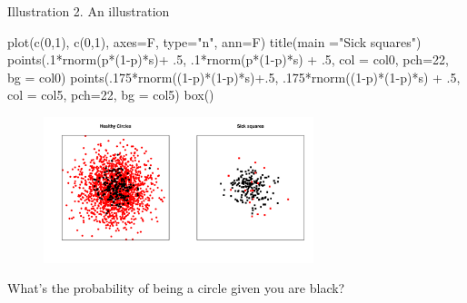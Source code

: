 \documentclass[
  11pt,
  ignorenonframetext,
]{beamer}
\newenvironment{Shaded}{\begin{snugshade}}{\end{snugshade}}
\newcommand{\AttributeTok}[1]{\textcolor[rgb]{0.40,0.45,0.13}{#1}}
\newcommand{\DecValTok}[1]{\textcolor[rgb]{0.68,0.00,0.00}{#1}}
\newcommand{\FunctionTok}[1]{\textcolor[rgb]{0.28,0.35,0.67}{#1}}
\newcommand{\NormalTok}[1]{\textcolor[rgb]{0.00,0.23,0.31}{#1}}
\newcommand{\SpecialCharTok}[1]{\textcolor[rgb]{0.37,0.37,0.37}{#1}}
\newcommand{\StringTok}[1]{\textcolor[rgb]{0.13,0.47,0.30}{#1}}
\begin{document}
\begin{frame}[fragile]{Illustration 2. An illustration}
\begin{Shaded}
\begin{Highlighting}[]
    \FunctionTok{plot}\NormalTok{(}\FunctionTok{c}\NormalTok{(}\DecValTok{0}\NormalTok{,}\DecValTok{1}\NormalTok{), }\FunctionTok{c}\NormalTok{(}\DecValTok{0}\NormalTok{,}\DecValTok{1}\NormalTok{), }\AttributeTok{axes=}\NormalTok{F, }\AttributeTok{type=}\StringTok{"n"}\NormalTok{, }\AttributeTok{ann=}\NormalTok{F)}
    \FunctionTok{title}\NormalTok{(}\AttributeTok{main =}\StringTok{"Sick squares"}\NormalTok{)}
    \FunctionTok{points}\NormalTok{(.}\DecValTok{1}\SpecialCharTok{*}\FunctionTok{rnorm}\NormalTok{(p}\SpecialCharTok{*}\NormalTok{(}\DecValTok{1}\SpecialCharTok{{-}}\NormalTok{p)}\SpecialCharTok{*}\NormalTok{s)}\SpecialCharTok{+}\NormalTok{ .}\DecValTok{5}\NormalTok{, .}\DecValTok{1}\SpecialCharTok{*}\FunctionTok{rnorm}\NormalTok{(p}\SpecialCharTok{*}\NormalTok{(}\DecValTok{1}\SpecialCharTok{{-}}\NormalTok{p)}\SpecialCharTok{*}\NormalTok{s) }\SpecialCharTok{+}\NormalTok{ .}\DecValTok{5}\NormalTok{, }\AttributeTok{col =}\NormalTok{ col0, }\AttributeTok{pch=}\DecValTok{22}\NormalTok{, }\AttributeTok{bg =}\NormalTok{ col0)}
    \FunctionTok{points}\NormalTok{(.}\DecValTok{175}\SpecialCharTok{*}\FunctionTok{rnorm}\NormalTok{((}\DecValTok{1}\SpecialCharTok{{-}}\NormalTok{p)}\SpecialCharTok{*}\NormalTok{(}\DecValTok{1}\SpecialCharTok{{-}}\NormalTok{p)}\SpecialCharTok{*}\NormalTok{s)}\SpecialCharTok{+}\NormalTok{.}\DecValTok{5}\NormalTok{, .}\DecValTok{175}\SpecialCharTok{*}\FunctionTok{rnorm}\NormalTok{((}\DecValTok{1}\SpecialCharTok{{-}}\NormalTok{p)}\SpecialCharTok{*}\NormalTok{(}\DecValTok{1}\SpecialCharTok{{-}}\NormalTok{p)}\SpecialCharTok{*}\NormalTok{s) }\SpecialCharTok{+}\NormalTok{ .}\DecValTok{5}\NormalTok{, }\AttributeTok{col =}\NormalTok{ col5, }\AttributeTok{pch=}\DecValTok{22}\NormalTok{, }\AttributeTok{bg =}\NormalTok{ col5) }
    \FunctionTok{box}\NormalTok{()}
\end{Highlighting}
\end{Shaded}

\begin{figure}

{\centering \includegraphics[width=0.7\textwidth,height=\textheight]{0_lectures_files/figure-beamer/unnamed-chunk-322-1.pdf}

}

\end{figure}

What's the probability of being a circle given you are black?
\end{frame}
\end{document}
